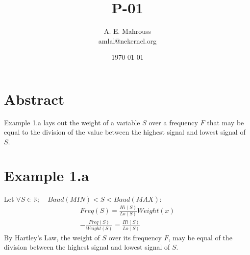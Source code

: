\documentclass{article}
\title{P-01}
\author{A. E. Mahrouss\\amlal@nekernel.org}
\date{\today}
\begin{document}
\maketitle

\section{Abstract}
Example 1.a lays out the weight of a variable $S$ over a frequency $F$ that may be equal to the division of the value between the highest signal and lowest signal of $S$.

\section{Example 1.a}
Let
$\forall S \in \mathbb{R}; \quad Baud(MIN) < S < Baud(MAX)$:
\begin{align*}
Freq(S) = \frac{Hi(S)}{Lo(S)} Weight(x)\\
-\frac{Freq(S)}{Weight(S)} = \frac{Hi(S)}{Lo(S)}
\end{align*}
By Hartley's Law, the weight of $S$ over its frequency $F$, may be equal of the division between the highest signal and lowest signal of $S$.

\nocite{*}



\end{document}

